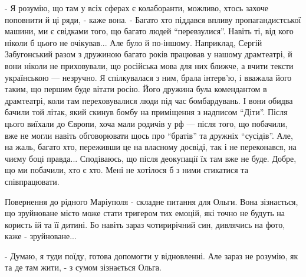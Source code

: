- Я розумію, що там у всіх сферах є колаборанти, можливо, хтось захоче
поповнити й ці ряди, - каже вона. -  Багато хто піддався впливу
пропагандистської машини, ми є свідками того, що багато людей \enquote{перевзулися}.
Навіть ті, від кого ніколи б цього не очікував... Але було й по-іншому.
Наприклад, Сергій Забугонський разом з дружиною багато років працював у нашому
драмтеатрі, й вони ніколи не приховували, що російська мова для них ближче, а
вчити тексти українською — незручно. Я спілкувалася з ним, брала інтерв'ю, і
вважала його таким, що першим буде вітати росію. Його дружина була комендантом
в драмтеатрі, коли там переховувалися люди під час бомбардувань. І вони обидва
бачили той літак, який скинув бомбу на приміщення з надписом \enquote{Діти}. Після
цього виїхали до Європи, хоча мали родичів у рф — після того, що побачили, вже
не могли навіть обговорювати щось про \enquote{братів} та дружніх \enquote{сусідів}. Але, на
жаль, багато хто, переживши це на власному досвіді, так і не переконався, на
чиєму боці правда... Сподіваюсь, що після деокупації їх там вже не буде. Добре,
що ми побачили, хто є хто. Мені не хотілося б з ними стикатися та
співпрацювати. 

Повернення до рідного Маріуполя - складне питання для Ольги. Вона зізнається,
що зруйноване місто може стати тригером тих емоцій, які точно не будуть на
користь їй та її дитині. Бо навіть зараз чотирирічний син, дивлячись на фото,
каже - зруйноване...  

- Думаю, я туди поїду, готова допомогти у відновленні. Але зараз не розумію, як
та де там жити, - з сумом зізнається Ольга.

